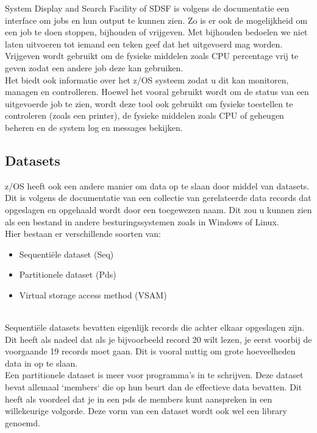 System Display and Search Facility of SDSF is volgens de \textcite{IBM2023} documentatie een interface om jobs en hun output te kunnen zien. Zo is er ook de mogelijkheid om een job te doen stoppen, bijhouden of vrijgeven. Met bijhouden bedoelen we niet laten uitvoeren tot iemand een teken geef dat het uitgevoerd mag worden. Vrijgeven wordt gebruikt om de fysieke middelen zoals CPU percentage vrij te geven zodat een andere job deze kan gebruiken. \\ 
Het biedt ook informatie over het z/OS systeem zodat u dit kan monitoren, managen en controlleren. Hoewel het vooral gebruikt wordt om de status van een uitgevoerde job te zien, wordt deze tool ook gebruikt om fysieke toestellen te controleren (zoals een printer), de fysieke middelen zoals CPU of geheugen beheren en de system log en messages bekijken.

\subsection{Datasets}
z/OS heeft ook een andere manier om data op te slaan door middel van datasets. Dit is volgens de documentatie van \textcite{IBM} een collectie van gerelateerde data records dat opgeslagen en opgehaald wordt door een toegewezen naam. Dit zou u kunnen zien als een bestand in andere besturingssystemen zoals in Windows of Linux. \\

Hier bestaan er verschillende soorten van:

\begin{itemize}
    \item Sequentiële dataset (Seq)
    \item Partitionele dataset (Pds)
    \item Virtual storage access method (VSAM)
\end{itemize} \\

Sequentiële datasets bevatten eigenlijk records die achter elkaar opgeslagen zijn. Dit heeft als nadeel dat als je bijvoorbeeld record 20 wilt lezen, je eerst voorbij de voorgaande 19 records moet gaan. Dit is vooral nuttig om grote hoeveelheden data in op te slaan. \\

Een partitionele dataset is meer voor programma's in te schrijven. Deze dataset bevat allemaal `members` die op hun beurt dan de effectieve data bevatten. Dit heeft als voordeel dat je in een pds de members kunt aanspreken in een willekeurige volgorde. Deze vorm van een dataset wordt ook wel een library genoemd. \\

